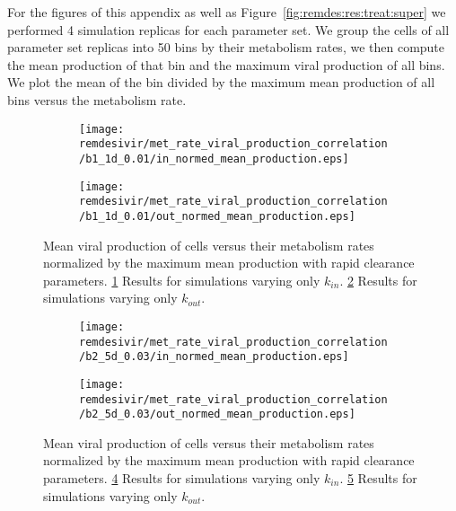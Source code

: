 For the figures of this appendix as well as Figure~\ref{fig:remdes:res:treat:super} we performed 4 simulation replicas for each parameter set. We group the cells of all parameter set replicas into 50 bins by their metabolism rates, we then compute the mean production of that bin and the maximum viral production of all bins. We plot the mean of the bin divided by the maximum mean production of all bins versus the metabolism rate.

\begin{figure}[H]
\begin{subfigure}{0.5\textwidth}
\texttt{[image: remdesivir/met\_rate\_viral\_production\_correlation/b1\_1d\_0.01/in\_normed\_mean\_production.eps]}
\caption{}\label{app:fig:res:treat:super:rapid:in}
\end{subfigure}
\vspace*{5pt}
\hspace*{\fill}

\begin{subfigure}{0.5\textwidth}
\texttt{[image: remdesivir/met\_rate\_viral\_production\_correlation/b1\_1d\_0.01/out\_normed\_mean\_production.eps]}
\caption{}\label{app:fig:res:treat:super:rapid:out}
\end{subfigure}
\caption{Mean viral production of cells versus their metabolism rates normalized by the maximum mean production with rapid clearance parameters.
 \ref{app:fig:res:treat:super:rapid:in} Results for simulations varying only $k_{in}$. \ref{app:fig:res:treat:super:rapid:out} Results for simulations varying only $k_{out}$.}\label{app:fig:res:treat:super:rapid}
\end{figure}

\begin{figure}[H]
\begin{subfigure}{0.5\textwidth}
\texttt{[image: remdesivir/met\_rate\_viral\_production\_correlation/b2\_5d\_0.03/in\_normed\_mean\_production.eps]}
\caption{}\label{app:fig:res:treat:super:slow:in}
\end{subfigure}
\vspace*{5pt}
\hspace*{\fill}

\begin{subfigure}{0.5\textwidth}
\texttt{[image: remdesivir/met\_rate\_viral\_production\_correlation/b2\_5d\_0.03/out\_normed\_mean\_production.eps]}
\caption{}\label{app:fig:res:treat:super:slow:out}
\end{subfigure}
\caption{Mean viral production of cells versus their metabolism rates normalized by the maximum mean production with rapid clearance parameters.
 \ref{app:fig:res:treat:super:slow:in} Results for simulations varying only $k_{in}$. \ref{app:fig:res:treat:super:slow:out} Results for simulations varying only $k_{out}$.}\label{app:fig:res:treat:super:slow}
\end{figure}


